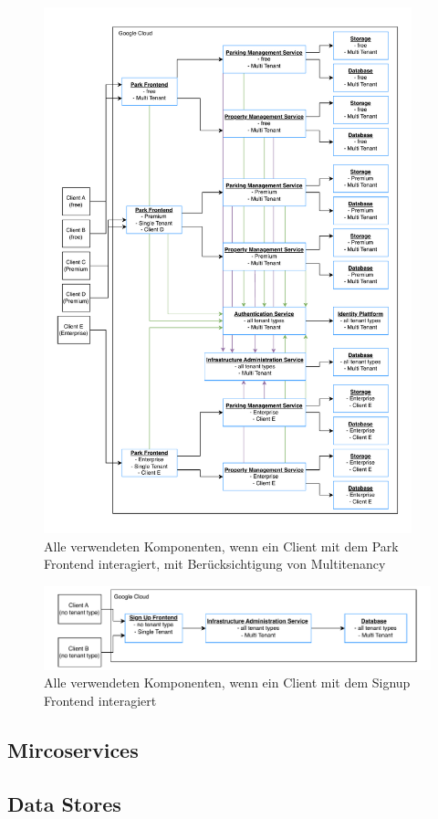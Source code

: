 \begin{figure}[ht]
  \centering
  \includegraphics[width=0.95\textwidth]{resources/03-runtime-view/pdf/components-frontend-park.pdf}
  \caption{Alle verwendeten Komponenten, wenn ein Client mit dem Park Frontend interagiert, mit Berücksichtigung von Multitenancy}
  \label{fig:03-components-park-frontend}
\end{figure}

\begin{figure}[ht]
  \centering
  \includegraphics[width=\textwidth]{resources/03-runtime-view/pdf/components-frontend-signup.pdf}
  \caption{Alle verwendeten Komponenten, wenn ein Client mit dem Signup Frontend interagiert}
  \label{fig:03-components-signup-frontend}
\end{figure}

\subsection{Mircoservices}
\subsection{Data Stores}